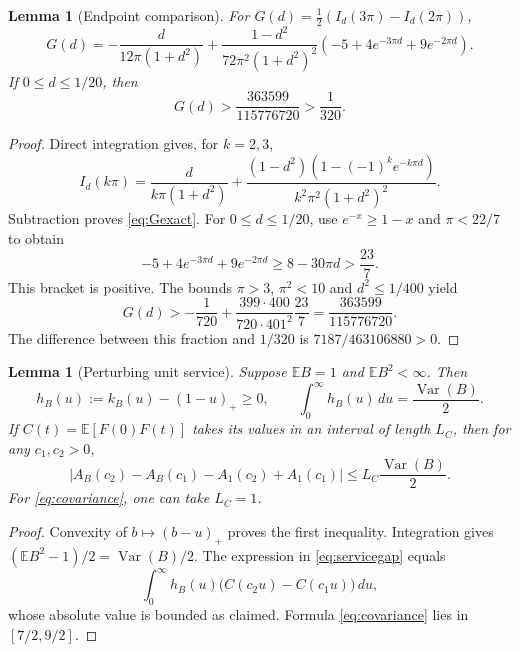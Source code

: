 \documentclass[11pt,reqno]{amsart}
\numberwithin{equation}{section}
\theoremstyle{plain}
\newtheorem{lemma}[theorem]{Lemma}
\theoremstyle{definition}
\newcommand{\E}{\mathbb E}
\newcommand{\1}{\mathbf 1}
\DeclareMathOperator{\Var}{Var}
\begin{document}
\begin{lemma}[Endpoint comparison]\label{lem:endpointgap}
For $G(d)=\tfrac12(I_d(3\pi)-I_d(2\pi))$,
\begin{equation}\label{eq:Gexact}
 G(d)=-\frac{d}{12\pi(1+d^2)}
 +\frac{1-d^2}{72\pi^2(1+d^2)^2}
 \left(-5+4e^{-3\pi d}+9e^{-2\pi d}\right).
\end{equation}
If $0\le d\le1/20$, then
\begin{equation}\label{eq:Gbound}
 G(d)>\frac{363599}{115776720}>\frac1{320}.
\end{equation}
\end{lemma}
\begin{proof}
Direct integration gives, for $k=2,3$,
\[
 I_d(k\pi)=\frac{d}{k\pi(1+d^2)}
 +\frac{(1-d^2)(1-(-1)^ke^{-k\pi d})}{k^2\pi^2(1+d^2)^2}.
\]
Subtraction proves \eqref{eq:Gexact}. For $0\le d\le1/20$, use $e^{-x}\ge1-x$ and $\pi<22/7$ to obtain
\[
 -5+4e^{-3\pi d}+9e^{-2\pi d}\ge8-30\pi d>\frac{23}{7}.
\]
This bracket is positive. The bounds $\pi>3$, $\pi^2<10$ and $d^2\le1/400$ yield
\[
 G(d)>-\frac1{720}
 +\frac{399\cdot400}{720\cdot401^2}\frac{23}{7}
 =\frac{363599}{115776720}.
\]
The difference between this fraction and $1/320$ is $7187/463106880>0$.
\end{proof}

\begin{lemma}[Perturbing unit service]\label{lem:service}
Suppose $\E B=1$ and $\E B^2<\infty$. Then
\begin{equation}\label{eq:kernelmass}
 h_B(u):=k_B(u)-(1-u)_+\ge0,
 \qquad \int_0^\infty h_B(u)\,du=\frac{\Var(B)}2.
\end{equation}
If $C(t)=\E[F(0)F(t)]$ takes its values in an interval of length $L_C$, then for any $c_1,c_2>0$,
\begin{equation}\label{eq:servicegap}
 \left|A_B(c_2)-A_B(c_1)-A_1(c_2)+A_1(c_1)\right|
 \le L_C\frac{\Var(B)}2.
\end{equation}
For \eqref{eq:covariance}, one can take $L_C=1$.
\end{lemma}
\begin{proof}
Convexity of $b\mapsto(b-u)_+$ proves the first inequality. Integration gives $(\E B^2-1)/2=\Var(B)/2$. The expression in \eqref{eq:servicegap} equals
\[
 \int_0^\infty h_B(u)\bigl(C(c_2u)-C(c_1u)\bigr)\,du,
\]
whose absolute value is bounded as claimed. Formula \eqref{eq:covariance} lies in $[7/2,9/2]$.
\end{proof}
\end{document}

